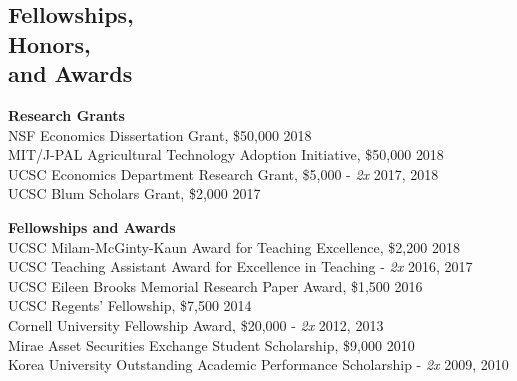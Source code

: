 \documentclass[letterpaper, margin, 10pt]{res} %
\begin{document}
\begin{resume}

\section{\sc \textbf{Fellowships, \\ Honors, \\ and Awards}}
{\bf Research Grants}\\
NSF Economics Dissertation Grant, \$50,000  \hfill{2018}\\
MIT/J-PAL Agricultural Technology Adoption Initiative, \$50,000   \hfill{2018}\\
UCSC Economics Department Research Grant, \$5,000 - \textit{2x}  \hfill{2017, 2018}\\
UCSC Blum Scholars Grant, \$2,000    \hfill{2017}

{\bf Fellowships and Awards}\\
UCSC Milam-McGinty-Kaun Award for Teaching Excellence, \$2,200  \hfill{2018}\\
UCSC Teaching Assistant Award for Excellence in Teaching -  \textit{2x}   \hfill{2016, 2017}\\
UCSC Eileen Brooks Memorial Research Paper Award, \$1,500  \hfill{2016}\\
UCSC Regents' Fellowship, \$7,500 \hfill{2014}\\
Cornell University Fellowship Award, \$20,000 -  \textit{2x} \hfill{2012, 2013}\\
Mirae Asset Securities Exchange Student Scholarship, \$9,000 \hfill{2010}\\
Korea University Outstanding Academic Performance Scholarship -  \textit{2x} \hfill{2009, 2010}



\end{resume}
\end{document}
